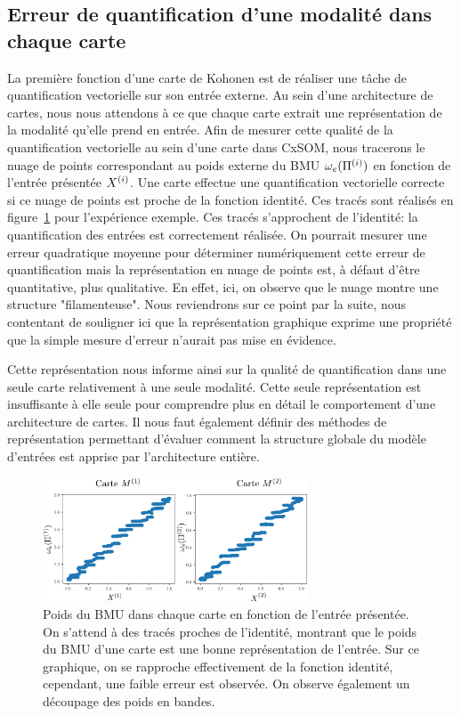 \subsection{Erreur de quantification d'une modalité dans chaque carte}

La première fonction d'une carte de Kohonen est de réaliser une tâche de quantification vectorielle sur son entrée externe. Au sein d'une architecture de cartes, nous nous attendons à ce que chaque carte extrait une représentation de la modalité qu'elle prend en entrée.
Afin de mesurer cette qualité de la quantification vectorielle au sein d'une carte dans CxSOM, nous tracerons le nuage de points correspondant au poids externe du BMU $\omega_e(\Pi^{({i})})$ en fonction de l'entrée présentée $X^{({i})}$. Une carte effectue une quantification vectorielle correcte si ce nuage de points est proche de la fonction identité.
Ces tracés sont réalisés en figure~\ref{fig:erreur} pour l'expérience exemple. Ces tracés s'approchent de l'identité: la quantification des entrées est correctement réalisée.
On pourrait mesurer une erreur quadratique moyenne pour déterminer numériquement cette erreur de quantification mais la représentation en nuage de points est, à défaut d'être quantitative, plus qualitative. En effet, ici, on observe que le nuage montre une structure "filamenteuse". Nous reviendrons sur ce point par la suite, nous contentant de souligner ici que la représentation graphique exprime une propriété que la simple mesure d'erreur n'aurait pas mise en évidence. 

Cette représentation nous informe ainsi sur la qualité de quantification dans une seule carte relativement à une seule modalité. Cette seule représentation est insuffisante à elle seule pour comprendre plus en détail le comportement d'une architecture de cartes.
Il nous faut également définir des méthodes de représentation permettant d'évaluer comment la structure globale du modèle d'entrées est apprise par l'architecture entière.

\begin{figure}
    \centering
    \includegraphics[width=0.7\textwidth]{w_x.pdf}
    \caption{Poids du BMU dans chaque carte en fonction de l'entrée présentée. On s'attend à des tracés proches de l'identité, montrant que le poids du BMU d'une carte est une bonne représentation de l'entrée. Sur ce graphique, on se rapproche effectivement de la fonction identité, cependant, une faible erreur est observée. On observe également un découpage des poids en bandes.\label{fig:erreur}}
\end{figure}


